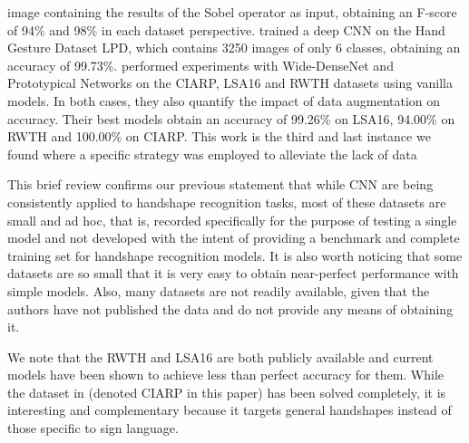 image containing the results of the Sobel operator as input, obtaining an F-score of 94\%  and  98\% in  each dataset perspective. \cite{alani2018peru} trained a deep CNN on the Hand Gesture Dataset LPD,  which contains 3250 images of only 6 classes, obtaining an accuracy of 99.73\%. \cite{cornejo2019hand} performed experiments with Wide-DenseNet and Prototypical Networks on the CIARP, LSA16 and RWTH datasets using vanilla models. In both cases, they also quantify the impact of data augmentation on accuracy. Their best models obtain an accuracy of 99.26\% on LSA16, 94.00\% on RWTH and 100.00\% on CIARP. This work is the third \cite{quiroga2017study,koller16:deephand} and last instance we found where a specific strategy was employed to alleviate the lack of data

This brief review confirms our previous statement that  while CNN are being consistently applied to handshape recognition tasks, most of these datasets are small and ad hoc, that is, recorded specifically for the purpose of testing a single model and not developed with the intent of providing a benchmark and complete training set for handshape recognition models. It is also worth noticing that some datasets are so small that it is very easy to obtain near-perfect performance with simple models. Also, many datasets are not readily available,  given that the authors have not published the data and do not provide any means of obtaining it.  

We note that the RWTH and LSA16 are both publicly available and current models have been shown to achieve less than perfect accuracy for them.  While the dataset in \cite{ciarp2018} (denoted CIARP in this paper) has been solved completely,  it is interesting and complementary because it targets general handshapes instead of those specific to sign language.
